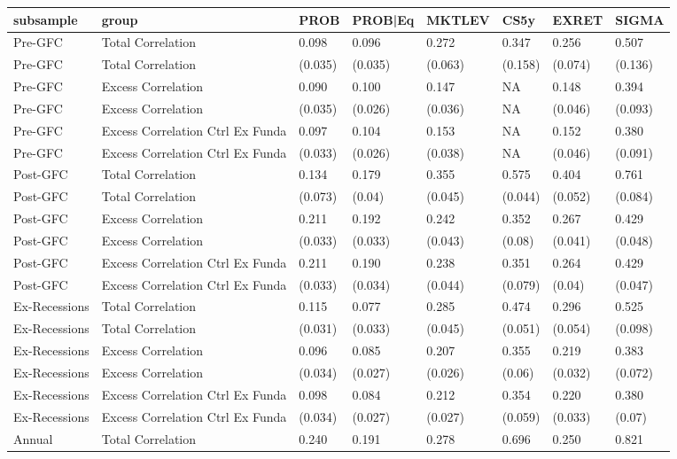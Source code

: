 
\begin{tabular}{l|l|l|l|l|l|l|l}
\hline
subsample & group & PROB & PROB|Eq & MKTLEV & CS5y & EXRET & SIGMA\\
\hline
Pre-GFC & Total Correlation & 0.098 & 0.096 & 0.272 & 0.347 & 0.256 & 0.507\\
Pre-GFC & Total Correlation & (0.035) & (0.035) & (0.063) & (0.158) & (0.074) & (0.136)\\
Pre-GFC & Excess Correlation & 0.090 & 0.100 & 0.147 & NA & 0.148 & 0.394\\
Pre-GFC & Excess Correlation & (0.035) & (0.026) & (0.036) & NA & (0.046) & (0.093)\\
Pre-GFC & Excess Correlation Ctrl Ex Funda & 0.097 & 0.104 & 0.153 & NA & 0.152 & 0.380\\
Pre-GFC & Excess Correlation Ctrl Ex Funda & (0.033) & (0.026) & (0.038) & NA & (0.046) & (0.091)\\
Post-GFC & Total Correlation & 0.134 & 0.179 & 0.355 & 0.575 & 0.404 & 0.761\\
Post-GFC & Total Correlation & (0.073) & (0.04) & (0.045) & (0.044) & (0.052) & (0.084)\\
Post-GFC & Excess Correlation & 0.211 & 0.192 & 0.242 & 0.352 & 0.267 & 0.429\\
Post-GFC & Excess Correlation & (0.033) & (0.033) & (0.043) & (0.08) & (0.041) & (0.048)\\
Post-GFC & Excess Correlation Ctrl Ex Funda & 0.211 & 0.190 & 0.238 & 0.351 & 0.264 & 0.429\\
Post-GFC & Excess Correlation Ctrl Ex Funda & (0.033) & (0.034) & (0.044) & (0.079) & (0.04) & (0.047)\\
Ex-Recessions & Total Correlation & 0.115 & 0.077 & 0.285 & 0.474 & 0.296 & 0.525\\
Ex-Recessions & Total Correlation & (0.031) & (0.033) & (0.045) & (0.051) & (0.054) & (0.098)\\
Ex-Recessions & Excess Correlation & 0.096 & 0.085 & 0.207 & 0.355 & 0.219 & 0.383\\
Ex-Recessions & Excess Correlation & (0.034) & (0.027) & (0.026) & (0.06) & (0.032) & (0.072)\\
Ex-Recessions & Excess Correlation Ctrl Ex Funda & 0.098 & 0.084 & 0.212 & 0.354 & 0.220 & 0.380\\
Ex-Recessions & Excess Correlation Ctrl Ex Funda & (0.034) & (0.027) & (0.027) & (0.059) & (0.033) & (0.07)\\
Annual & Total Correlation & 0.240 & 0.191 & 0.278 & 0.696 & 0.250 & 0.821\\

\end{tabular}
